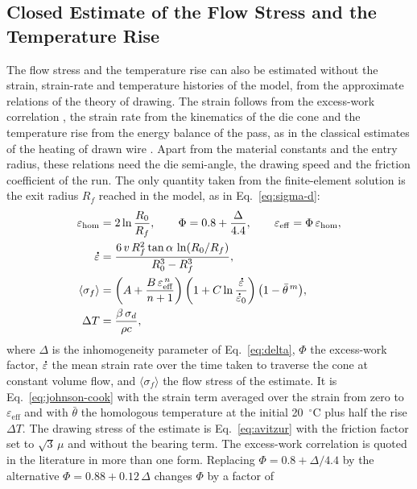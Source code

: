 \documentclass[pdflatex,sn-basic,Numbered]{sn-jnl}
\newcommand{\edot}{\accentset{\scalebox{0.4}{$\bullet$}}{\varepsilon}}
\begin{document}
\begin{appendices}
\section{Closed Estimate of the Flow Stress and the Temperature Rise}\label{app:closed}

The flow stress and the temperature rise can also be estimated without the strain, strain-rate and
temperature histories of the model, from the approximate relations of the theory of drawing. The
strain follows from the excess-work correlation \citep{backofen1972deformation}, the strain rate
from the kinematics of the die cone and the temperature rise from the energy balance of the pass,
as in the classical estimates of the heating of drawn wire \citep{siebel1943erwaermung}. Apart from
the material constants and the entry radius, these relations need the die semi-angle, the drawing
speed and the friction coefficient of the run. The only quantity taken from the finite-element
solution is the exit radius $R_f$ reached in the model, as in Eq.~\eqref{eq:sigma-d}:
\begin{align}
\varepsilon_{\mathrm{hom}} &= 2\ln\frac{R_0}{R_f}, \qquad
\Phi = 0.8 + \frac{\Delta}{4.4}, \qquad
\varepsilon_{\mathrm{eff}} = \Phi\,\varepsilon_{\mathrm{hom}}, \label{eq:closed-strain}\\
\edot &= \frac{6\,v\,R_f^2\tan\alpha\,\ln(R_0/R_f)}{R_0^3-R_f^3}, \label{eq:closed-rate}\\
\langle\sigma_f\rangle &= \left(A + \frac{B\,\varepsilon_{\mathrm{eff}}^{\,n}}{n+1}\right)
  \left(1 + C\ln\frac{\edot}{\edot_0}\right)
  \bigl(1 - \bar\theta^{\,m}\bigr), \label{eq:closed-flow}\\
\Delta T &= \frac{\beta\,\sigma_d}{\rho c}, \label{eq:closed-rest}
\end{align}
where $\Delta$ is the inhomogeneity parameter of Eq.~\eqref{eq:delta}, $\Phi$ the excess-work factor, $\edot$ the mean strain rate over the time taken to
traverse the cone at constant volume flow, and $\langle\sigma_f\rangle$ the flow stress of the
estimate. It is Eq.~\eqref{eq:johnson-cook} with the strain term averaged over the strain from zero
to $\varepsilon_{\mathrm{eff}}$ and with $\bar\theta$ the homologous temperature at the initial
20~$^\circ$C plus half the rise $\Delta T$. The drawing stress of the estimate is
Eq.~\eqref{eq:avitzur} with the friction factor set to $\sqrt3\,\mu$ and without the bearing term. The
excess-work correlation is quoted in the literature in more than one form. Replacing
$\Phi = 0.8+\Delta/4.4$ by the alternative $\Phi = 0.88+0.12\,\Delta$ changes $\Phi$ by a factor of

\end{appendices}
\end{document}
